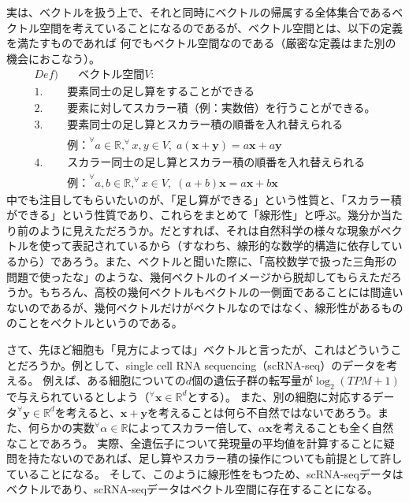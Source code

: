 \documentclass[10pt]{ujarticle}
\begin{document}
実は、ベクトルを扱う上で、それと同時にベクトルの帰属する全体集合であるベクトル空間を考えていることになるのであるが、ベクトル空間とは、以下の定義を満たすものであれば
何でもベクトル空間なのである（厳密な定義はまた別の機会におこなう）。
$$
\begin{aligned}
  Def)&\quad\text{ベクトル空間} V:\\
  1.& \text{要素同士の足し算をすることができる}\\
  2.& \text{要素に対してスカラー積（例：実数倍）を行うことができる。}\\
  3.& \text{要素同士の足し算とスカラー積の順番を入れ替えられる}\\
  &\text{例：}^\forall a\in\mathbb{R},^\forall x,y\in V,\; a(\mathbf{x+y})=a\mathbf{x}+a\mathbf{y}\\
  4.& \text{スカラー同士の足し算とスカラー積の順番を入れ替えられる}\\
  &\text{例：}^\forall a,b\in\mathbb{R},^\forall x\in V,\; (a+b)\mathbf{x}=a\mathbf{x}+b\mathbf{x}
\end{aligned}
$$
中でも注目してもらいたいのが、「足し算ができる」という性質と、「スカラー積ができる」という性質であり、これらをまとめて「線形性」と呼ぶ。幾分か当たり前のように見えただろうか。だとすれば、それは自然科学の様々な現象がベクトルを使って表記されているから（すなわち、線形的な数学的構造に依存しているから）であろう。また、ベクトルと聞いた際に、「高校数学で扱った三角形の問題で使ったな」のような、幾何ベクトルのイメージから脱却してもらえただろうか。もちろん、高校の幾何ベクトルもベクトルの一側面であることには間違いないのであるが、幾何ベクトルだけがベクトルなのではなく、線形性があるもののことをベクトルというのである。

さて、先ほど細胞も「見方によっては」ベクトルと言ったが、これはどういうことだろうか。例として、single cell RNA sequencing（scRNA-seq）のデータを考える。
例えば、ある細胞についての$d$個の遺伝子群の転写量が$\log_2(TPM+1)$で与えられているとしよう（$^\forall\mathbf{x}\in\mathbb{R}^d$とする）。
また、別の細胞に対応するデータ$^\forall\mathbf{y}\in\mathbb{R}^d$を考えると、$\mathbf{x+y}$を考えることは何ら不自然ではないであろう。また、何らかの実数$^\forall\alpha\in\mathbb{R}$によってスカラー倍して、$\alpha\mathbf{x}$を考えることも全く自然なことであろう。
実際、全遺伝子について発現量の平均値を計算することに疑問を持たないのであれば、足し算やスカラー積の操作についても前提として許していることになる。
そして、このように線形性をもつため、scRNA-seqデータはベクトルであり、scRNA-seqデータはベクトル空間に存在することになる。
\end{document}
